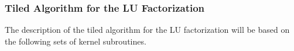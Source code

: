 \documentclass{article}
\begin{document}




\subsubsection{Tiled Algorithm for the LU Factorization}

The description of the tiled algorithm for the LU factorization will be based on
the following sets of kernel subroutines.
\end{document}
